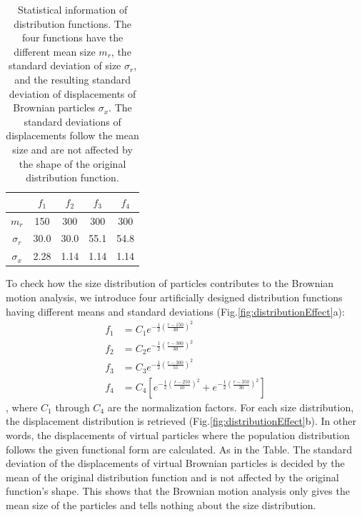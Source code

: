 \begin{table}[h!]
\footnotesize
\centering
\begin{tabular}{c|cccc}
                    & $f_1$   & $f_2$   & $f_3$  & $f_4$   \\ \hline
$m_r$          & 150     & 300    & 300    & 300 \\
$\sigma_r$   & 30.0    & 30.0    & 55.1    & 54.8 \\
$\sigma_x$  & 2.28    & 1.14    & 1.14    & 1.14
\end{tabular}
\caption{Statistical information of distribution functions. The four functions have the different mean size $m_r$, the standard deviation of size $\sigma_r$, and the resulting standard deviation of displacements of Brownian particles $\sigma_x$. The standard deviations of displacements follow the mean size and are not affected by the shape of the original distribution function.}
\label{table:standardDeviation}
\end{table}

To check how the size distribution of particles contributes to the Brownian motion analysis, we introduce four artificially designed distribution functions having different means and standard deviations (Fig.\ref{fig:distributionEffect}a):
\begingroup
\allowdisplaybreaks
\begin{align}
f_1 &= C_1 e^{ - \frac{1}{2} \left( \frac{r - 150}{30} \right)^2 } \\
f_2 &= C_2 e^{ - \frac{1}{2} \left( \frac{r - 300}{30} \right)^2 } \\
f_3 &= C_3 e^{ - \frac{1}{2} \left( \frac{r - 300}{55} \right)^2 } \\
f_4 &= C_4 \left[ e^{ - \frac{1}{2} \left( \frac{r - 250}{10} \right)^2 } + e^{ - \frac{1}{2} \left( \frac{r - 350}{30} \right)^2 } \right]
\end{align}
\endgroup
, where $C_1$ through $C_4$ are the normalization factors. For each size distribution, the displacement distribution is retrieved (Fig.\ref{fig:distributionEffect}b). In other words, the displacements of virtual particles where the population distribution follows the given functional form are calculated. As in the Table. The standard deviation of the displacements of virtual Brownian particles is decided by the mean of the original distribution function and is not affected by the original function's shape. This shows that the Brownian motion analysis only gives the mean size of the particles and tells nothing about the size distribution.



